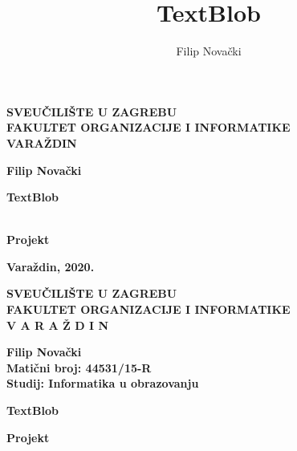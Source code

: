 \documentclass[10pt]{foi}
\title{TextBlob}
\author{Filip Novački}
\newcommand{\vrstaRada}{Projekt} %
\newcommand{\godina}{2020}
\newcommand{\indeks}{44531/15-R}
\newcommand{\smjer}{Informatika u obrazovanju} %
\begin{document}
\thispagestyle{empty}
\begin{center}
  {\large \fontsize{14}{17}\selectfont\bfseries{SVEU\v CILI\v STE U ZAGREBU}} \\[8pt]
  {\large \fontsize{14}{17}\selectfont\bfseries{FAKULTET ORGANIZACIJE I INFORMATIKE}} \\[8pt]
  {\large \fontsize{14}{17}\selectfont\bfseries{VARA\v ZDIN}}
\end{center}

\vskip 20mm
\begin{flushleft}
\Large \bfseries{Filip Novački}
\end{flushleft}

\vskip 60mm
\begin{center}
	{
		\linespread{2.5}\sffamily\bfseries{\fontsize{22}{27}\selectfont\MakeUppercase
		TextBlob}\par}\ \\[10mm]
{\normalfont \large \bfseries{\fontsize{14}{17}\selectfont\MakeUppercase \vrstaRada }}
\end{center}

\vfill
\begin{center}
{\large \bfseries{Vara\v zdin}, \bfseries{\godina}.}
\end{center}

\newpage

\thispagestyle{empty}
\begin{center}
  {\bfseries{SVEU\v CILI\v STE U ZAGREBU}} \\[12pt]
  {\bfseries{FAKULTET ORGANIZACIJE I INFORMATIKE}} \\[12pt]
  {\bfseries{V A R A \v Z D I N}}
\end{center}

\vskip 15mm
\begin{flushleft}
{\bfseries{Filip Novački}}\\[8pt]
{\bfseries{Matični broj:} \bfseries{\indeks}}\\[8pt]
{\bfseries{Studij:} \bfseries{\smjer}}\\[8pt]
\end{flushleft}

\vskip 40mm
\begin{center}
{\sffamily \bfseries{\fontsize{14}{17}\selectfont\MakeUppercase
	TextBlob}\par} \vspace{10mm}
{\normalfont \bfseries{\MakeUppercase Projekt}}
\end{center}
\end{document}
